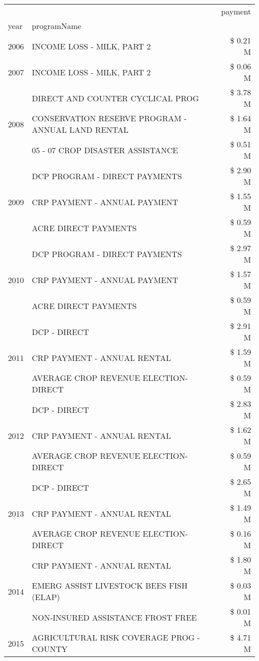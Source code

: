 \begin{tabular}{llr}
\toprule
 &  & payment \\
year & programName &  \\
\midrule
2006 & INCOME LOSS - MILK, PART 2 & \$ 0.21 M \\
\cline{1-3}
2007 & INCOME LOSS - MILK, PART 2 & \$ 0.06 M \\
\cline{1-3}
\multirow[t]{3}{*}{2008} & DIRECT AND COUNTER CYCLICAL PROG & \$ 3.78 M \\
 & CONSERVATION RESERVE PROGRAM - ANNUAL LAND RENTAL & \$ 1.64 M \\
 & 05 - 07 CROP DISASTER ASSISTANCE & \$ 0.51 M \\
\cline{1-3}
\multirow[t]{3}{*}{2009} & DCP PROGRAM - DIRECT PAYMENTS & \$ 2.90 M \\
 & CRP PAYMENT - ANNUAL PAYMENT & \$ 1.55 M \\
 & ACRE DIRECT PAYMENTS & \$ 0.59 M \\
\cline{1-3}
\multirow[t]{3}{*}{2010} & DCP PROGRAM - DIRECT PAYMENTS & \$ 2.97 M \\
 & CRP PAYMENT - ANNUAL PAYMENT & \$ 1.57 M \\
 & ACRE DIRECT PAYMENTS & \$ 0.59 M \\
\cline{1-3}
\multirow[t]{3}{*}{2011} & DCP - DIRECT & \$ 2.91 M \\
 & CRP PAYMENT - ANNUAL RENTAL & \$ 1.59 M \\
 & AVERAGE CROP REVENUE ELECTION-DIRECT & \$ 0.59 M \\
\cline{1-3}
\multirow[t]{3}{*}{2012} & DCP - DIRECT & \$ 2.83 M \\
 & CRP PAYMENT - ANNUAL RENTAL & \$ 1.62 M \\
 & AVERAGE CROP REVENUE ELECTION-DIRECT & \$ 0.59 M \\
\cline{1-3}
\multirow[t]{3}{*}{2013} & DCP - DIRECT & \$ 2.65 M \\
 & CRP PAYMENT - ANNUAL RENTAL & \$ 1.49 M \\
 & AVERAGE CROP REVENUE ELECTION-DIRECT & \$ 0.16 M \\
\cline{1-3}
\multirow[t]{3}{*}{2014} & CRP PAYMENT - ANNUAL RENTAL & \$ 1.80 M \\
 & EMERG ASSIST LIVESTOCK BEES FISH (ELAP) & \$ 0.03 M \\
 & NON-INSURED ASSISTANCE FROST FREE & \$ 0.01 M \\
\cline{1-3}
\multirow[t]{3}{*}{2015} & AGRICULTURAL RISK COVERAGE PROG - COUNTY & \$ 4.71 M \\

\end{tabular}
